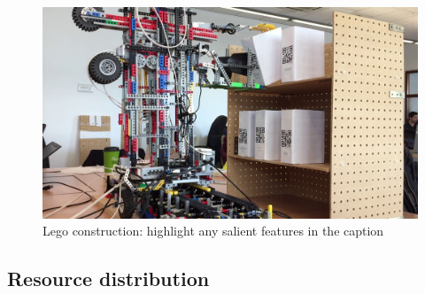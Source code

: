\documentclass{article}
\begin{document}



\begin{figure}[tb]
\vskip 5mm
\begin{center}
\centerline{\includegraphics[width=\columnwidth]{figs/crane}}
\caption{Lego construction: highlight any salient features in the caption}
\label{fig:sample-fig}
\end{center}
\vskip -5mm
\end{figure} 


\subsection{Resource distribution}
\end{document}
